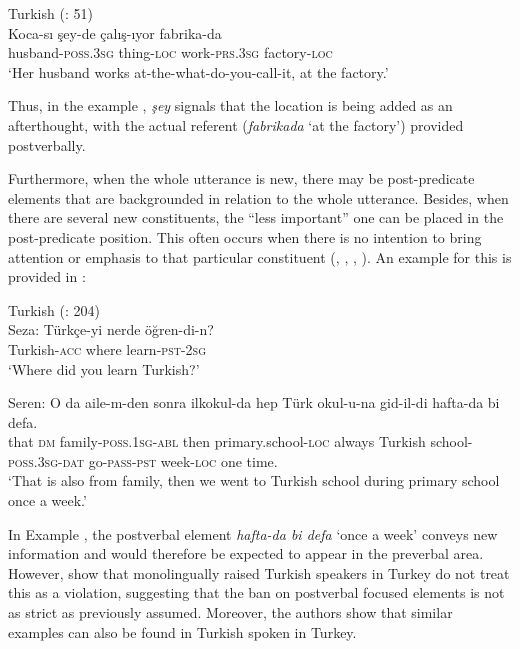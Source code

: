 \ea%
  \label{ex:key:7} Turkish (\citealt{Erguvanli1984}: 51)\\
\gll Koca-sı    şey-de    çalış-ıyor    fabrika-da \\
 husband-\textsc{poss}.3\textsc{sg}  thing-\textsc{loc}  work-\textsc{prs}.3\textsc{sg}    factory-\textsc{loc}\\
\glt ‘Her husband works at-the-what-do-you-call-it, at the factory.’
  \z

Thus, in the example , \textit{şey} signals that the location is being added as an afterthought, with the actual referent (\textit{fabrikada} ‘at the factory’) provided postverbally.

Furthermore, when the whole utterance is new, there may be post-predicate elements that are backgrounded in relation to the whole utterance. Besides, when there are several new constituents, the “less important” one can be placed in the post-predicate position. This often occurs when there is no intention to bring attention or emphasis to that particular constituent (\citealt{Kilicaslan2004}, \citealt{DogruozBackus2007}, \citealt{AkanHartmann2019}, \citealt{Issever2019}). An example for this is provided in \citet[204]{DogruozBackus2007}:


\ea%
  \label{ex:key:8} Turkish (\citealt{DogruozBackus2007}: 204)\\
       Seza:
       \gll Türkçe-yi nerde öğren-di-n? \\
  Turkish-\textsc{acc} where learn-\textsc{pst}-\textsc{2sg}\\
 \glt  ‘Where did you learn Turkish?’

Seren:
\gll  O da aile-m-den sonra ilkokul-da hep Türk okul-u-na gid-il-di hafta-da bi defa.\\
  that \textsc{dm} family-\textsc{poss}.\textsc{1sg}-\textsc{abl} then primary.school-\textsc{loc} always  Turkish school-\textsc{poss}.\textsc{3sg}-\textsc{dat} go-\textsc{pass}-\textsc{pst} week-\textsc{loc} one time. \\
\glt ‘That is also from family, then we went to Turkish school during primary school once a week.’
  \z

In Example , the postverbal element \textit{hafta-da bi defa} ‘once a week’ conveys new information and would therefore be expected to appear in the preverbal area. However, \citet{DogruozBackus2007} show that monolingually raised Turkish speakers in Turkey do not treat this as a violation, suggesting that the ban on postverbal focused elements is not as strict as previously assumed. Moreover, the authors show that similar examples can also be found in Turkish spoken in Turkey.

